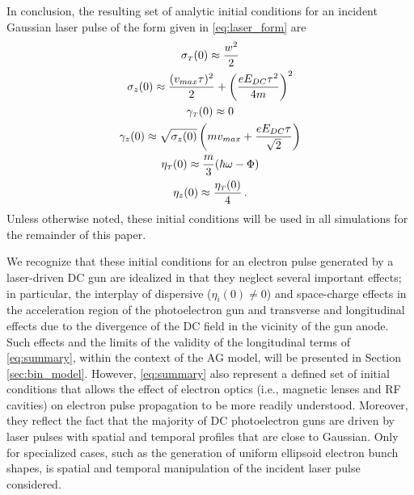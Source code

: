 In conclusion, the resulting set of analytic initial conditions for an incident Gaussian laser pulse of the form given in \ref{eq:laser_form} are
\begin{subequations} \label{eq:summary}
  \begin{gather}
    \sigma_{ {\scriptscriptstyle T} } ( 0 ) \approx \frac{ w^{ 2 } }{ 2 } \\
    \sigma_{ z } ( 0 ) \approx \frac{ ( v_{max} \tau )^{ 2 } }{ 2 } + \left ( \frac{ e E_{ DC } \tau^{ 2 } }{ 4 m } \right )^{ 2 } \\
    \gamma_{ {\scriptscriptstyle T} } ( 0 ) \approx 0 \\
    \gamma_{ z } ( 0 ) \approx \sqrt{ \sigma_{ z } ( 0 ) } \left ( m v_{max} + \frac{ e E_{DC} \tau }{ \sqrt{ 2 } } \right ) \\
    \eta_{ {\scriptscriptstyle T} } ( 0 ) \approx \frac{ m }{ 3 } ( \hbar \omega - \Phi ) \\
    \eta_{ z } ( 0 ) \approx \frac{ \eta_{ {\scriptscriptstyle T} } ( 0 ) }{ 4 } \, \text{.}
  \end{gather}
\end{subequations}
Unless otherwise noted, these initial conditions will be used in all simulations for the remainder of this paper.

We recognize that these initial conditions for an electron pulse generated by a laser-driven DC gun are idealized in that they neglect several important effects; in particular, the interplay of dispersive ($ \eta_{i}(0) \neq 0 $) and space-charge effects in the acceleration region of the photoelectron gun and transverse and longitudinal effects due to the divergence of the DC field in the vicinity of the gun anode.\cite{berger_dc_2009,togawa_ceb6_2007}
Such effects and the limits of the validity of the longitudinal terms of \ref{eq:summary}, within the context of the AG model, will be presented in Section \ref{sec:bin_model}.
However, \ref{eq:summary} also represent a defined set of initial conditions that allows the effect of electron optics (i.e., magnetic lenses and RF cavities) on electron pulse propagation to be more readily understood.
Moreover, they reflect the fact that the majority of DC photoelectron guns are driven by laser pulses with spatial and temporal profiles that are close to Gaussian.\cite{williamson_clocking_1997,sciaini_electronic_2009}
Only for specialized cases, such as the generation of uniform ellipsoid electron bunch shapes, is spatial and temporal manipulation of the incident laser pulse considered.\cite{luiten_how_2004,li_generating_2008}

